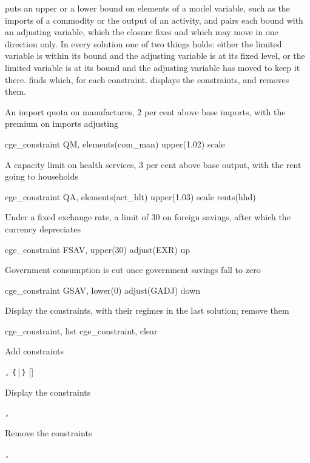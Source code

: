 

 puts an upper or a lower bound on elements of a model
variable, such as the imports of a commodity or the output of an activity, and
pairs each bound with an adjusting variable, which the closure fixes and which
may move in one direction only. In every solution one of two things holds:
either the limited variable is within its bound and the adjusting variable is
at its fixed level, or the limited variable is at its bound and the adjusting
variable has moved to keep it there.  finds which, for each
constraint.  displays the constraints, and
 removes them.


An import quota on manufactures, 2 per cent above base imports, with the
premium on imports adjusting
\begin{stcode}
cge_constraint QM, elements(com_man) upper(1.02) scale
\end{stcode}
A capacity limit on health services, 3 per cent above base output, with the
rent going to households
\begin{stcode}
cge_constraint QA, elements(act_hlt) upper(1.03) scale rents(hhd)
\end{stcode}
Under a fixed exchange rate, a limit of 30 on foreign savings, after which the
currency depreciates
\begin{stcode}
cge_constraint FSAV, upper(30) adjust(EXR) up
\end{stcode}
Government consumption is cut once government savings fall to zero
\begin{stcode}
cge_constraint GSAV, lower(0) adjust(GADJ) down
\end{stcode}
Display the constraints, with their regimes in the last solution; remove them
\begin{stcode}
cge_constraint, list
cge_constraint, clear
\end{stcode}


Add constraints
\begin{stsyntax}
 \texttt{,}
\texttt{\{}\,|\,\texttt{\}}
[]
\end{stsyntax}
Display the constraints
\begin{stsyntax}
\texttt{,} 
\end{stsyntax}
Remove the constraints
\begin{stsyntax}
\texttt{,} 
\end{stsyntax}

